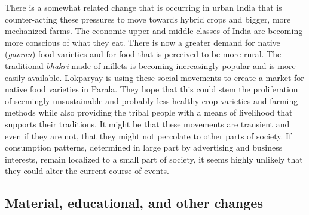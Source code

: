 \documentclass[report.tex]{subfiles}
\begin{document}
There is a somewhat related change that is occurring in urban India that is counter-acting these pressures to move towards hybrid crops and bigger, more mechanized farms. The economic upper and middle classes of India are becoming more conscious of what they eat. There is now a greater demand for native (\textit{gavran}) food varieties and for food that is perceived to be more rural. The traditional \textit{bhakri} made of millets is becoming increasingly popular and is more easily available. Lokparyay is using these social movements to create a market for native food varieties in Parala. They hope that this could stem the proliferation of seemingly unsustainable and probably less healthy crop varieties and farming methods while also providing the tribal people with a means of livelihood that supports their traditions. It might be that these movements are transient and even if they are not, that they might not percolate to other parts of society. If consumption patterns, determined in large part by advertising and business interests, remain localized to a small part of society, it seems highly unlikely that they could alter the current course of events.

\newpage

\subsection{Material, educational, and other changes}
\end{document}
